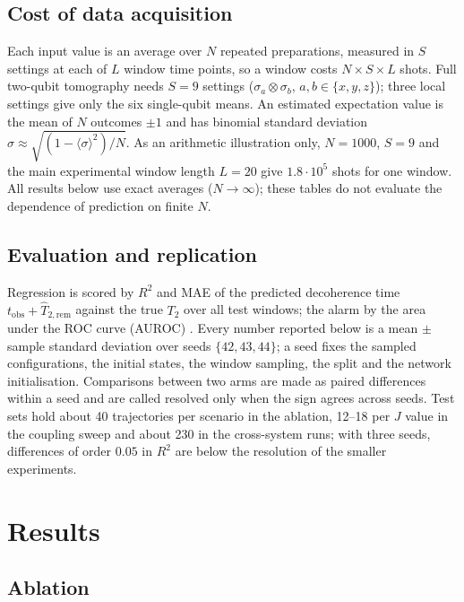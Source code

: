 \documentclass[twocolumn,10pt]{article}
\begin{document}
\subsection{Cost of data acquisition}
\label{sec:cost}

Each input value is an average over $N$ repeated preparations, measured
in $S$ settings at each of $L$ window time points, so a window costs
$N\times S\times L$ shots. Full two-qubit tomography needs $S=9$
settings ($\sigma_a\otimes\sigma_b$, $a,b\in\{x,y,z\}$); three local
settings give only the six single-qubit means. An estimated expectation
value is the mean of $N$ outcomes $\pm1$ and has binomial standard
deviation $\sigma \approx \sqrt{(1-\langle\sigma\rangle^2)/N}$.
As an arithmetic illustration only, $N=1000$, $S=9$ and the main
experimental window length $L=20$ give $1.8\cdot10^{5}$ shots for one
window. All results below use exact averages ($N\to\infty$); these
tables do not evaluate the dependence of prediction on finite $N$.

\subsection{Evaluation and replication}

Regression is scored by $R^2$ and MAE of the predicted decoherence time
$t_\mathrm{obs} + \widehat T_{2,\mathrm{rem}}$ against the true $T_2$ over
all test windows; the alarm by the area under the ROC curve (AUROC)
\cite{Fawcett2006}.
Every number reported below is a mean $\pm$ sample standard deviation
over seeds $\{42, 43, 44\}$; a seed fixes the sampled configurations,
the initial states, the window sampling, the split and the network
initialisation.
Comparisons between two arms are made as paired differences within a
seed and are called resolved only when the sign agrees across seeds.
Test sets hold about 40 trajectories per scenario in the ablation, 12--18
per $J$ value in the coupling sweep and about 230 in the cross-system
runs; with three seeds, differences of order $0.05$ in $R^2$ are below
the resolution of the smaller experiments.

\section{Results}

\subsection{Ablation}
\label{sec:e1}
\end{document}

